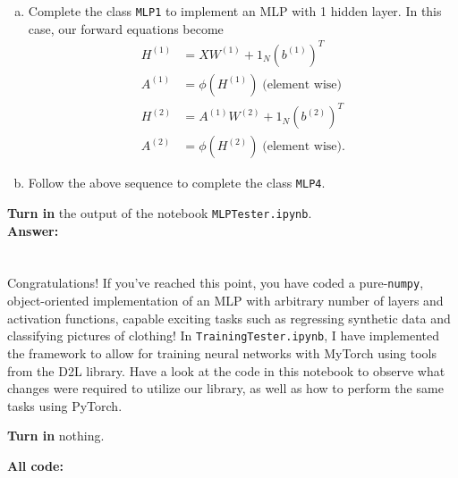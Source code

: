 \documentclass{article}[12pt]
\begin{document}
\begin{enumerate}[(a)]
\begin{itemize}
        \end{itemize}
    \item Complete the class \texttt{MLP1} to implement an MLP with 1 hidden layer. In this case, our forward equations become
        \begin{align*}
            H^{(1)} &= X W^{(1)} + 1_{N} (b^{(1)})^{T} \\
            A^{(1)} &= \phi\left( H^{(1)} \right) \; \text{(element wise)} \\
            H^{(2)} &= A^{(1)} W^{(2)} + 1_{N} (b^{(2)})^{T} \\
            A^{(2)} &= \phi\left( H^{(2)} \right) \; \text{(element wise)}.
        \end{align*}
    \item Follow the above sequence to complete the class \texttt{MLP4}.
\end{enumerate}
\textbf{Turn in} the output of the notebook \texttt{MLPTester.ipynb}.\\

\textbf{Answer:}\\


\clearpage
\section{}

Congratulations! If you've reached this point, you have coded a pure-\texttt{numpy}, object-oriented implementation of an MLP with arbitrary number of layers and activation functions, capable exciting tasks such as regressing synthetic data and classifying pictures of clothing! In \texttt{TrainingTester.ipynb}, I have implemented the framework to allow for training neural networks with MyTorch using tools from the D2L library. Have a look at the code in this notebook to
observe what changes were required to utilize our library, as well as how to perform the same tasks using PyTorch.

\vspace{1em}
\noindent \textbf{Turn in} nothing.

\textbf{All code:}\\
\end{document}
